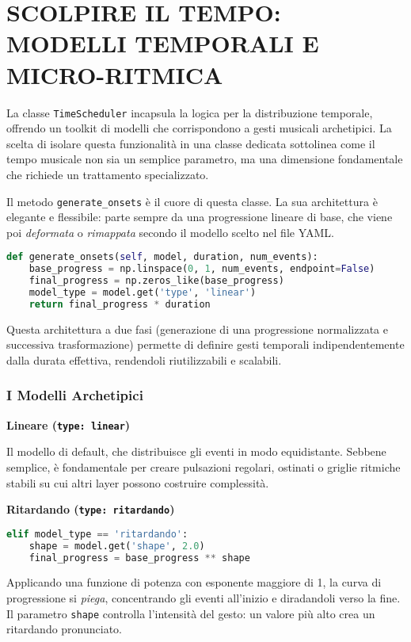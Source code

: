 
\section{SCOLPIRE IL TEMPO: MODELLI TEMPORALI E MICRO-RITMICA}
La classe \texttt{TimeScheduler} incapsula la logica per la distribuzione temporale, offrendo un toolkit di modelli che corrispondono a gesti musicali archetipici. La scelta di isolare questa funzionalità in una classe dedicata sottolinea come il tempo musicale non sia un semplice parametro, ma una dimensione fondamentale che richiede un trattamento specializzato.

Il metodo \texttt{generate\_onsets} è il cuore di questa classe. La sua architettura è elegante e flessibile: parte sempre da una progressione lineare di base, che viene poi \textit{deformata} o \textit{rimappata} secondo il modello scelto nel file YAML.

\begin{lstlisting}[language=Python]
def generate_onsets(self, model, duration, num_events):
    base_progress = np.linspace(0, 1, num_events, endpoint=False)
    final_progress = np.zeros_like(base_progress)
    model_type = model.get('type', 'linear')
    return final_progress * duration
\end{lstlisting}

Questa architettura a due fasi (generazione di una progressione normalizzata e successiva trasformazione) permette di definire gesti temporali indipendentemente dalla durata effettiva, rendendoli riutilizzabili e scalabili.
\subsubsection{I Modelli Archetipici}
\textbf{Lineare (\texttt{type: linear})}

Il modello di default, che distribuisce gli eventi in modo equidistante. Sebbene semplice, è fondamentale per creare pulsazioni regolari, ostinati o griglie ritmiche stabili su cui altri layer possono costruire complessità.

\textbf{Ritardando (\texttt{type: ritardando})} 
\begin{lstlisting}[language=Python]
elif model_type == 'ritardando':
    shape = model.get('shape', 2.0)
    final_progress = base_progress ** shape
\end{lstlisting}
Applicando una funzione di potenza con esponente maggiore di 1, la curva di progressione si \textit{piega}, concentrando gli eventi all'inizio e diradandoli verso la fine. Il parametro \texttt{shape} controlla l'intensità del gesto: un valore più alto crea un ritardando pronunciato.

